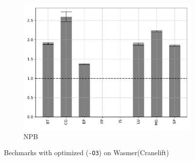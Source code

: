 \begin{figure}
\begin{subfigure}[t]{.45\textwidth}
        \includegraphics[width=\textwidth]
        {Images/6.1.RQ1/npb-wasmer-cranelift-opt.pdf}
        \caption{NPB}
    \end{subfigure}
    \caption{Bechmarks with optimized (\texttt{-O3}) on Wasmer(Cranelift)}
\end{figure}

